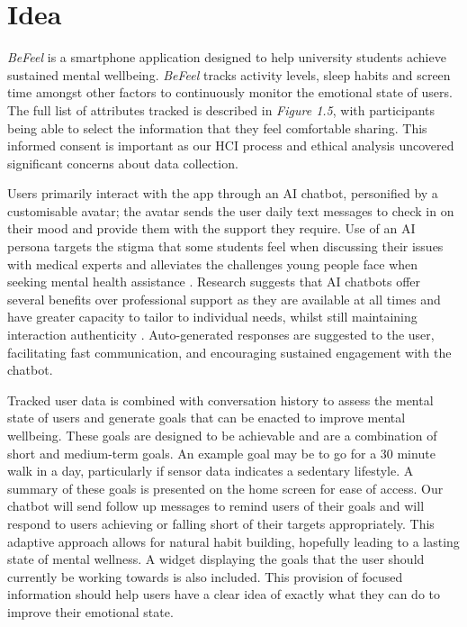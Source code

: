 \documentclass[acmsmall, screen, nonacm, 9pt, a4paper,top=2cm,bottom=2cm,left=1cm,right=1cm, marginparwidth=1cm]{acmart}
\begin{document}
\section{Idea}
\emph{BeFeel} is a smartphone application designed to help university students achieve sustained mental wellbeing. \emph{BeFeel} tracks activity levels, sleep habits and screen time amongst other factors to continuously monitor the emotional state of users. The full list of attributes tracked is described in \emph{Figure 1.5}, with participants being able to select the information that they feel comfortable sharing. This informed consent is important \cite{MozillaOurIncluded} as our HCI process and ethical analysis uncovered significant concerns about data collection.

Users primarily interact with the app through an AI chatbot, personified by a customisable avatar; the avatar sends the user daily text messages to check in on their mood and provide them with the support they require. Use of an AI persona targets the stigma that some students feel when discussing their issues with medical experts \cite{MichaelN.Sharpe2004TheEducation} and alleviates the challenges young people face when seeking mental health assistance \cite{Biddle2004FactorsSurvey.}. Research suggests that AI chatbots offer several benefits over professional support as they are available at all times and have greater capacity to tailor to individual needs, whilst still maintaining interaction authenticity \cite{Brandtzaeg2022MyFriendship}. Auto-generated responses are suggested to the user, facilitating fast communication, and encouraging sustained engagement with the chatbot.

Tracked user data is combined with conversation history to assess the mental state of users and generate goals that can be enacted to improve mental wellbeing. These goals are designed to be achievable and are a combination of short and medium-term goals. An example goal may be to go for a 30 minute walk in a day, particularly if sensor data indicates a sedentary lifestyle. A summary of these goals is presented on the home screen for ease of access. Our chatbot will send follow up messages to remind users of their goals and will respond to users achieving or falling short of their targets appropriately. This adaptive approach allows for natural habit building, hopefully leading to a lasting state of mental wellness. A widget displaying the goals that the user should currently be working towards is also included. This provision of focused information should help users have a clear idea \cite{ThereseFessendenAesthetic8} of exactly what they can do to improve their emotional state.
\end{document}
